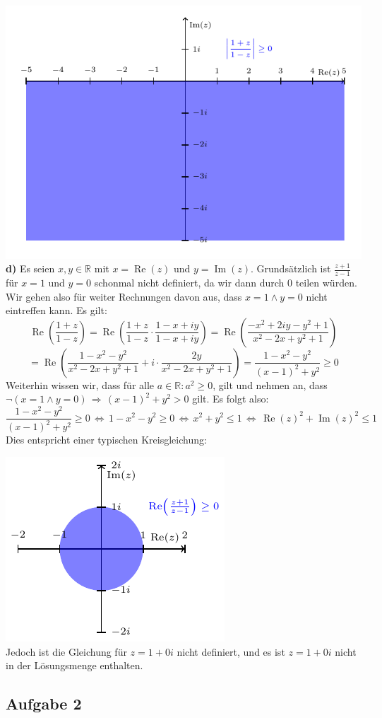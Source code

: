 \documentclass[a4paper,graphics,11pt]{article}
\newcommand{\aufgabe}[1]{\subsection*{Aufgabe #1}}
\newcommand{\re}{\operatorname{Re}}
\newcommand{\im}{\operatorname{Im}}
\begin{document}
\newpage
\qquad\qquad\qquad\includegraphics{graphics/graph5.pdf}\\
\textbf{d)}
Es seien $x,y \in \mathbb{R}$ mit $x=\re(z)$ und $y=\im(z)$.
Grundsätzlich ist $\frac{z+1}{z-1}$ für $x=1$ und $y=0$ schonmal nicht definiert, da wir
dann durch 0 teilen würden. Wir gehen also für weiter Rechnungen davon aus, dass
$x=1 \land y=0$ nicht eintreffen kann. Es gilt:
$$
    \re\left(\frac{1+z}{1-z}\right)
    = \re\left(\frac{1+z}{1-z} \cdot \frac{1-x+iy}{1-x+iy}\right)
    = \re\left(\frac{-x^2+2iy-y^2+1}{x^2-2x+y^2+1}\right)
$$$$
    = \re\left(\frac{1-x^2-y^2}{x^2-2x+y^2+1} + i\cdot \frac{2y}{x^2-2x+y^2+1}\right)
    = \frac{1-x^2-y^2}{(x-1)^2+y^2} \geq 0
$$
Weiterhin wissen wir, dass für alle $a \in \mathbb{R}\colon a^2 \geq 0$, gilt und nehmen
an, dass\\
$\lnot(x = 1 \land y = 0) \,\Longrightarrow\, (x-1)^2+y^2 > 0$ gilt. Es folgt also:
$$
    \frac{1-x^2-y^2}{(x-1)^2+y^2} \geq 0
    \,\Longleftrightarrow\, 1-x^2-y^2 \geq 0
    \,\Longleftrightarrow\, x^2+y^2 \leq 1
    \,\Longleftrightarrow\, \re(z)^2+\im(z)^2 \leq 1
$$
Dies entspricht einer typischen Kreisgleichung:\\
\strut\qquad\qquad\qquad\qquad\qquad\qquad\includegraphics[scale=1.5]{graphics/graph0.pdf}\\
Jedoch ist die Gleichung für $z = 1+0i$ nicht definiert, und es ist $z = 1+0i$ nicht in
der Lösungsmenge enthalten.
\newpage
\aufgabe{2}
\end{document}

